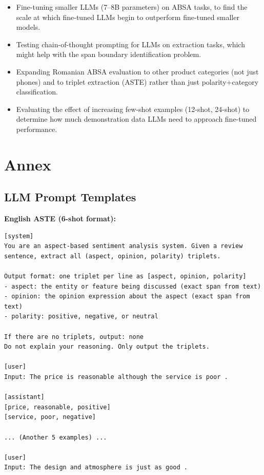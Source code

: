 \documentclass[12pt,a4paper]{report}
\begin{document}
\begin{itemize}
    \item Fine-tuning smaller LLMs (7--8B parameters) on ABSA tasks, to find the scale at which fine-tuned LLMs begin to outperform fine-tuned smaller models.
    \item Testing chain-of-thought prompting for LLMs on extraction tasks, which might help with the span boundary identification problem.
    \item Expanding Romanian ABSA evaluation to other product categories (not just phones) and to triplet extraction (ASTE) rather than just polarity+category classification.
    \item Evaluating the effect of increasing few-shot examples (12-shot, 24-shot) to determine how much demonstration data LLMs need to approach fine-tuned performance.
\end{itemize}


\chapter{Annex}\label{ch:annex}

\section{LLM Prompt Templates}\label{annex:few-shot-prompts}

\textbf{English ASTE (6-shot format):}
\begin{lstlisting}
[system]
You are an aspect-based sentiment analysis system. Given a review sentence, extract all (aspect, opinion, polarity) triplets.

Output format: one triplet per line as [aspect, opinion, polarity]
- aspect: the entity or feature being discussed (exact span from text)
- opinion: the opinion expression about the aspect (exact span from text)
- polarity: positive, negative, or neutral

If there are no triplets, output: none
Do not explain your reasoning. Only output the triplets.

[user]
Input: The price is reasonable although the service is poor .

[assistant]
[price, reasonable, positive]
[service, poor, negative]

... (Another 5 examples) ...

[user]
Input: The design and atmosphere is just as good .
\end{lstlisting}
\end{document}
